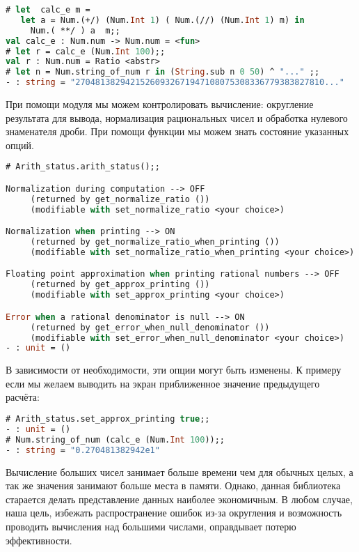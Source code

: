 \begin{lstlisting}[language=OCaml]
# let  calc_e m =  
   let a = Num.(+/) (Num.Int 1) ( Num.(//) (Num.Int 1) m) in 
     Num.( **/ ) a  m;;
val calc_e : Num.num -> Num.num = <fun>
# let r = calc_e (Num.Int 100);;
val r : Num.num = Ratio <abstr>
# let n = Num.string_of_num r in (String.sub n 0 50) ^ "..." ;;
- : string = "27048138294215260932671947108075308336779383827810..."
\end{lstlisting}

При помощи модуля  мы можем контролировать вычисление: 
округление результата для вывода, нормализация рациональных чисел и обработка 
нулевого знаменателя дроби. При помощи функции  мы можем 
знать состояние указанных опций.

\begin{lstlisting}[language=OCaml]
# Arith_status.arith_status();;

Normalization during computation --> OFF
     (returned by get_normalize_ratio ())
     (modifiable with set_normalize_ratio <your choice>)

Normalization when printing --> ON
     (returned by get_normalize_ratio_when_printing ())
     (modifiable with set_normalize_ratio_when_printing <your choice>)

Floating point approximation when printing rational numbers --> OFF
     (returned by get_approx_printing ())
     (modifiable with set_approx_printing <your choice>)

Error when a rational denominator is null --> ON
     (returned by get_error_when_null_denominator ())
     (modifiable with set_error_when_null_denominator <your choice>)
- : unit = ()
\end{lstlisting}

В зависимости от необходимости, эти опции могут быть изменены. К примеру если мы 
желаем выводить на экран приближенное значение предыдущего расчёта:

\begin{lstlisting}[language=OCaml]
# Arith_status.set_approx_printing true;;
- : unit = ()
# Num.string_of_num (calc_e (Num.Int 100));;
- : string = "0.270481382942e1"
\end{lstlisting}

Вычисление больших чисел занимает больше времени чем для обычных целых, а так же 
значения занимают больше места в памяти. Однако, данная библиотека старается 
делать представление данных наиболее экономичным. В любом случае, наша цель, 
избежать распространение ошибок из-за округления и возможность проводить 
вычисления над большими числами, оправдывает потерю эффективности.

